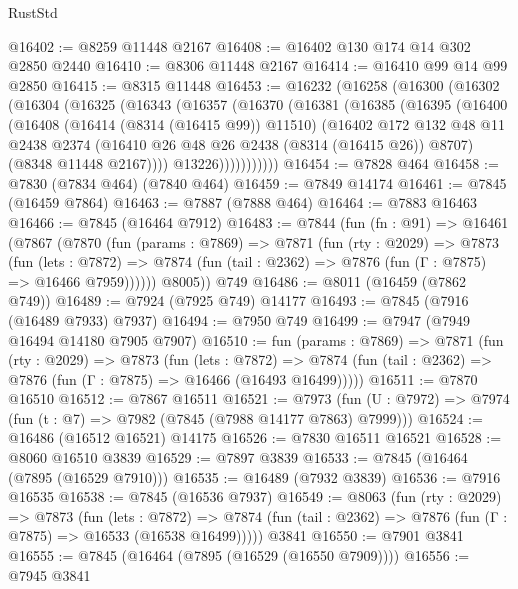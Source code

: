 \begin{lexlean}{RustStd}
\begin{coremodule}
@16402 := @8259 @11448 @2167
@16408 := @16402 @130 @174 @14 @302 @2850 @2440
@16410 := @8306 @11448 @2167
@16414 := @16410 @99 @14 @99 @2850
@16415 := @8315 @11448
@16453 := @16232
    (@16258
      (@16300
        (@16302
          (@16304
            (@16325
              (@16343
                (@16357
                  (@16370
                    (@16381
                      (@16385
                        (@16395
                          (@16400
                            (@16408
                              (@16414 (@8314 (@16415 @99)) @11510)
                              (@16402
                                @172
                                @132
                                @48
                                @11
                                @2438
                                @2374
                                (@16410 @26 @48 @26 @2438 (@8314 (@16415 @26)) @8707)
                                (@8348 @11448 @2167))))
                          @13226)))))))))))
@16454 := @7828 @464
@16458 := @7830 (@7834 @464) (@7840 @464)
@16459 := @7849 @14174
@16461 := @7845 (@16459 @7864)
@16463 := @7887 (@7888 @464)
@16464 := @7883 @16463
@16466 := @7845 (@16464 @7912)
@16483 := @7844
    (fun (fn : @91) =>
    @16461
      (@7867
        (@7870
          (fun (params : @7869) =>
          @7871
            (fun (rty : @2029) =>
            @7873
              (fun (lets : @7872) =>
              @7874 (fun (tail : @2362) => @7876 (fun (Γ : @7875) => @16466 @7959))))))
        @8005))
    @749
@16486 := @8011 (@16459 (@7862 @749))
@16489 := @7924 (@7925 @749) @14177
@16493 := @7845 (@7916 (@16489 @7933) @7937)
@16494 := @7950 @749
@16499 := @7947 (@7949 @16494 @14180 @7905 @7907)
@16510 := fun (params : @7869) =>
  @7871
    (fun (rty : @2029) =>
    @7873
      (fun (lets : @7872) =>
      @7874 (fun (tail : @2362) => @7876 (fun (Γ : @7875) => @16466 (@16493 @16499)))))
@16511 := @7870 @16510
@16512 := @7867 @16511
@16521 := @7973
    (fun (U : @7972) => @7974 (fun (t : @7) => @7982 (@7845 (@7988 @14177 @7863) @7999)))
@16524 := @16486 (@16512 @16521) @14175
@16526 := @7830 @16511 @16521
@16528 := @8060 @16510 @3839
@16529 := @7897 @3839
@16533 := @7845 (@16464 (@7895 (@16529 @7910)))
@16535 := @16489 (@7932 @3839)
@16536 := @7916 @16535
@16538 := @7845 (@16536 @7937)
@16549 := @8063
    (fun (rty : @2029) =>
    @7873
      (fun (lets : @7872) =>
      @7874 (fun (tail : @2362) => @7876 (fun (Γ : @7875) => @16533 (@16538 @16499)))))
    @3841
@16550 := @7901 @3841
@16555 := @7845 (@16464 (@7895 (@16529 (@16550 @7909))))
@16556 := @7945 @3841

\end{coremodule}
\end{lexlean}
